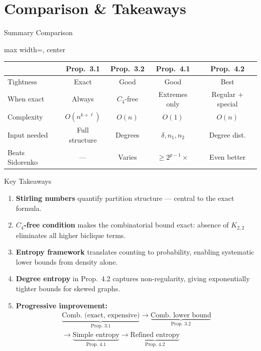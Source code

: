 \documentclass[10pt]{beamer}
\begin{document}
\section{Comparison \& Takeaways}

\begin{frame}{Summary Comparison}
  \begin{adjustbox}{max width=\linewidth, center}
    \begin{tabular}{lcccc}
      \toprule
      & \textbf{Prop.\ 3.1} & \textbf{Prop.\ 3.2} & \textbf{Prop.\ 4.1} & \textbf{Prop.\ 4.2} \\
      \midrule
      Tightness     & Exact          & Good        & Good           & Best \\
      When exact    & Always         & $C_4$-free  & Extremes only  & Regular + special \\
      Complexity    & $O(n^{k+\ell})$& $O(n)$      & $O(1)$         & $O(n)$ \\
      Input needed  & Full structure & Degrees     & $\delta, n_1, n_2$ & Degree dist. \\
      Beats Sidorenko & ---          & Varies      & $\geq 2^{p-1}\times$ & Even better \\
      \bottomrule
    \end{tabular}
  \end{adjustbox}
\end{frame}

\begin{frame}{Key Takeaways}
  \begin{enumerate}
    \item \textbf{Stirling numbers} quantify partition structure --- central to the exact formula.
    \item \textbf{$C_4$-free condition} makes the combinatorial bound exact: absence of $K_{2,2}$ eliminates all higher biclique terms.
    \item \textbf{Entropy framework} translates counting to probability, enabling systematic lower bounds from density alone.
    \item \textbf{Degree entropy} in Prop.\ 4.2 captures non-regularity, giving exponentially tighter bounds for skewed graphs.
    \item \textbf{Progressive improvement:}
      \begin{multline*}
        \underbrace{\text{Comb.\ (exact, expensive)}}_{\text{Prop.\ 3.1}}
        \to \underbrace{\text{Comb.\ lower bound}}_{\text{Prop.\ 3.2}} \\
        \to \underbrace{\text{Simple entropy}}_{\text{Prop.\ 4.1}}
        \to \underbrace{\text{Refined entropy}}_{\text{Prop.\ 4.2}}
      \end{multline*}
  \end{enumerate}
\end{frame}
\end{document}
